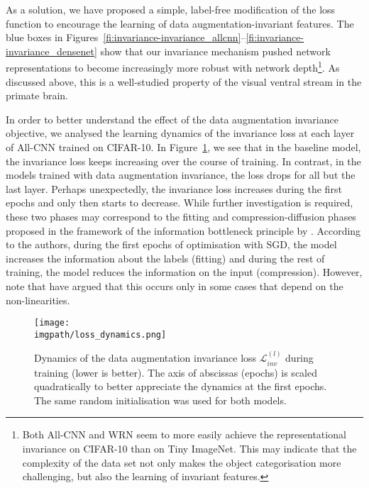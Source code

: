 {As a solution, we have proposed a simple, label-free modification of the loss function to encourage the learning of data augmentation-invariant features. The blue boxes in Figures~\ref{fi:invariance-invariance_allcnn}--\ref{fi:invariance-invariance_densenet} show that our invariance mechanism pushed network representations to become increasingly more robust with network depth\footnote{Both All-CNN and WRN seem to more easily achieve the representational invariance on CIFAR-10 than on Tiny ImageNet. This may indicate that the complexity of the data set not only makes the object categorisation more challenging, but also the learning of invariant features.}. As discussed above, this is a well-studied property of the visual ventral stream in the primate brain. 

In order to better understand the effect of the data augmentation invariance objective, we analysed the learning dynamics of the invariance loss at each layer of All-CNN trained on CIFAR-10. In Figure~\ref{fig:dynamics}, we see that in the baseline model, the invariance loss keeps increasing over the course of training. In contrast, in the models trained with data augmentation invariance, the loss drops for all but the last layer. Perhaps unexpectedly, the invariance loss increases during the first epochs and only then starts to decrease. While further investigation is required, these two phases may correspond to the fitting and compression-diffusion phases proposed in the framework of the information bottleneck principle by \citet{shwartz2017bottleneck}. According to the authors, during the first epochs of optimisation with SGD, the model increases the information about the labels (fitting) and during the rest of training, the model reduces the information on the input (compression). However, note that \citet{saxe2019informationbottleneck} have argued that this occurs only in some cases that depend on the non-linearities.

\begin{figure}[ht]
  \begin{center}
    \texttt{[image: \\imgpath/loss\_dynamics.png]}
  \end{center}
  \caption{Dynamics of the data augmentation invariance loss $\mathcal{L}_{inv}^{(l)}$ during training (lower is better). The axis of abscissas (epochs) is scaled quadratically to better appreciate the dynamics at the first epochs. The same random initialisation was used for both models.}
  \label{fig:dynamics}
\end{figure}

}
